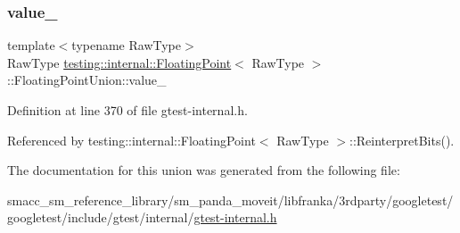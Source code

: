 \subsubsection{\texorpdfstring{value\+\_\+}{value\_}}
{\footnotesize\ttfamily template$<$typename Raw\+Type$>$ \\
Raw\+Type \hyperlink{classtesting_1_1internal_1_1FloatingPoint}{testing\+::internal\+::\+Floating\+Point}$<$ Raw\+Type $>$\+::Floating\+Point\+Union\+::value\+\_\+}



Definition at line 370 of file gtest-\/internal.\+h.



Referenced by testing\+::internal\+::\+Floating\+Point$<$ Raw\+Type $>$\+::\+Reinterpret\+Bits().



The documentation for this union was generated from the following file\+:\begin{DoxyCompactItemize}
\item 
smacc\+\_\+sm\+\_\+reference\+\_\+library/sm\+\_\+panda\+\_\+moveit/libfranka/3rdparty/googletest/googletest/include/gtest/internal/\hyperlink{gtest-internal_8h}{gtest-\/internal.\+h}\end{DoxyCompactItemize}
